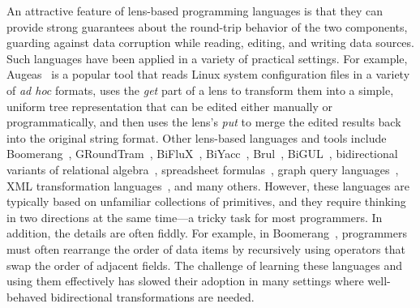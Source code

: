 \documentclass[numbers,10pt,preprint\ifanon ,nocopyrightspace\fi]{sigplanconf}
\begin{document}
An attractive feature of lens-based programming languages is that they can
provide strong guarantees about the round-trip behavior of the two
components, guarding against data corruption while reading,
editing, and writing data sources.  
%
Such languages have been applied in a variety of practical settings.  For
example, Augeas~\cite{augeas} is a popular tool that reads Linux system
configuration files in a variety of {\em ad hoc} formats, uses the
\emph{get} part of a lens to transform them into a simple, uniform tree
representation that can be edited either manually or programmatically, and
then uses the lens's \emph{put} to merge the edited results back into the
original string format.  Other lens-based languages and tools include
%
Boomerang~\cite{boomerang, Matching10}, 
%
GRoundTram~\cite{Hidaka2011GRoundTramAI},
%
BiFluX~\cite{DBLP:conf/ppdp/PachecoZH14}, 
%
BiYacc~\cite{DBLP:conf/staf/ZhuK0SH15},
%
Brul~\cite{DBLP:conf/etaps/ZanLKH16},
%
BiGUL~\cite{DBLP:conf/pepm/KoZH16}, 
%
bidirectional variants of 
relational algebra~\cite{BohannonPierceVaughan},
spreadsheet formulas~\cite{DBLP:conf/vl/MacedoPSC14},
graph query languages~\cite{DBLP:conf/icfp/HidakaHIKMN10},
XML transformation languages~\cite{DBLP:conf/pepm/LiuHT07}, 
%
and many others.
%
However, these languages are typically based on unfamiliar collections
of primitives, and they require thinking in two directions at the same
time---a tricky task for most programmers.  In addition, the details are
often fiddly.  For example, in Boomerang~\cite{boomerang, Matching10},
programmers must often rearrange the order of data items by recursively
using operators that swap the order of adjacent fields.  The challenge of
learning these languages and using them effectively has slowed their
adoption in many settings where well-behaved bidirectional transformations
are needed.
\end{document}
